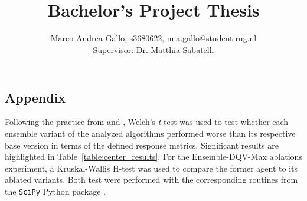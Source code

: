 \documentclass[10pt,a4paper,twocolumn]{article}
\title{\vspace{-0.5in}{\bfseries\scshape
    Addressing Bootstrapping Errors in Offline Reinforcement Learning
    with Ensembles
    } \\
    \vspace{1ex}
    \normalsize{Bachelor's Project Thesis}\vspace{-2ex}
}
\author{
    \normalsize{Marco Andrea Gallo, s3680622, m.a.gallo@student.rug.nl} \\
    \normalsize{Supervisor: Dr. Matthia Sabatelli}
}
\date{\vspace{-5ex}}
\begin{document}
\twocolumn[
  \maketitle
  \begin{@twocolumnfalse}
    
  \end{@twocolumnfalse}
]

\thispagestyle{firststyle}









\clearpage

\begin{appendices}
  \section{Appendix}
  Following the practice from \citet{DBLP:journals/corr/abs-1709-06560}
  and \citet{https://doi.org/10.48550/arxiv.1904.06979}, Welch's
  \textit{t}-test was used to test whether each ensemble variant of the
  analyzed algorithms performed worse than its respective base version
  in terms of the defined response metrics. Significant results are
  highlighted in Table~\ref{table:center_results}.
  For the Ensemble-DQV-Max ablations experiment, a Kruskal-Wallis H-test
  was used to compare the former agent to its ablated variants.
  Both test were performed with the corresponding routines from the
  \texttt{SciPy} Python package \citep{2020SciPy-NMeth}.

  
  \newpage
  
  \newpage
\end{appendices}
\end{document}
